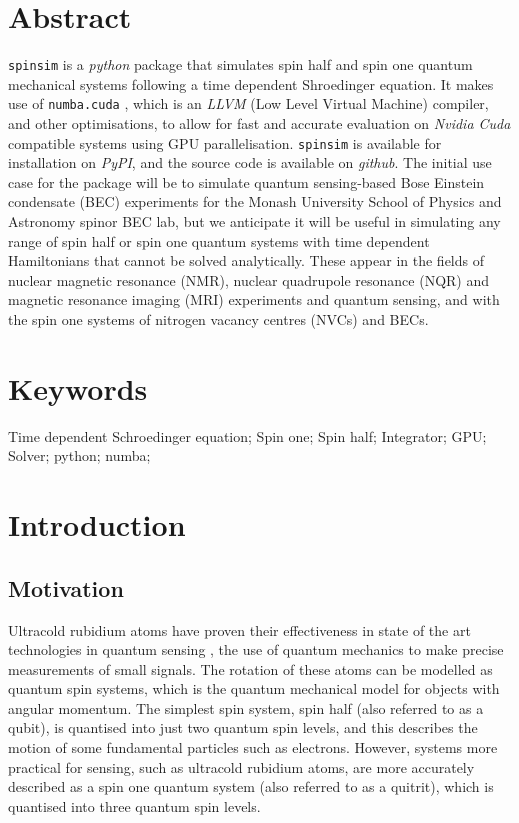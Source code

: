 \documentclass{jors}
\begin{document}
\section*{Abstract}
	\texttt{spinsim} is a \emph{python} package that simulates spin half and spin one quantum mechanical systems following a time dependent Shroedinger equation. It makes use of \texttt{numba.cuda} \cite{lam_numba_2015}, which is an \emph{LLVM} (Low Level Virtual Machine) \cite{lattner_llvm_2004} compiler, and other optimisations, to allow for fast and accurate evaluation on \emph{Nvidia Cuda} \cite{nickolls_scalable_2008} compatible systems using GPU parallelisation. \texttt{spinsim} is available for installation on \emph{PyPI}, and the source code is available on \emph{github}. The initial use case for the package will be to simulate quantum sensing-based Bose Einstein condensate (BEC) experiments for the Monash University School of Physics and Astronomy spinor BEC lab, but we anticipate it will be useful in simulating any range of spin half or spin one quantum systems with time dependent Hamiltonians that cannot be solved analytically. These appear in the fields of nuclear magnetic resonance (NMR), nuclear quadrupole resonance (NQR) and magnetic resonance imaging (MRI) experiments and quantum sensing, and with the spin one systems of nitrogen vacancy centres (NVCs) and BECs.

\section*{Keywords}
Time dependent Schroedinger equation; Spin one; Spin half; Integrator; GPU; Solver; python; numba;

\section*{Introduction}
\subsection*{Motivation}
	Ultracold rubidium atoms have proven their effectiveness in state of the art technologies in quantum sensing \cite{degen_quantum_2017}, the use of quantum mechanics to make precise measurements of small signals. The rotation of these atoms can be modelled as quantum spin systems, which is the quantum mechanical model for objects with angular momentum. The simplest spin system, spin half (also referred to as a qubit), is quantised into just two quantum spin levels, and this describes the motion of some fundamental particles such as electrons. However, systems more practical for sensing, such as ultracold rubidium atoms, are more accurately described as a spin one quantum system (also referred to as a quitrit), which is quantised into three quantum spin levels.
	
\end{document}
